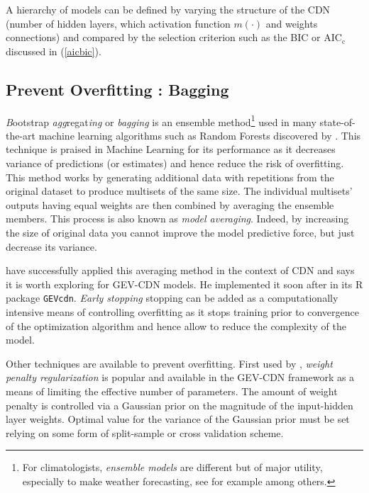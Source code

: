 A hierarchy of models can be defined by varying the structure of the CDN (number of hidden layers, which activation function $m(\cdot)$ and weights connections)  and compared by the selection criterion such as the BIC or $\text{AIC}_{\text{c}}$ discussed in (\ref{aicbic}). 


\subsection{Prevent Overfitting : Bagging} 


\emph{B}ootstrap \emph{agg}regat\emph{ing} or \emph{bagging} is an ensemble method\footnote{For climatologists, \emph{ensemble models} are different but of major utility, especially to make weather forecasting, see for example \citet{suh_development_2012} among others.} used in many state-of-the-art machine learning algorithms such as Random Forests discovered by \citet{Breiman_2001}. This technique is praised in Machine Learning for its performance as it decreases variance of predictions (or estimates) and hence reduce the risk of overfitting. This method works by generating additional data with repetitions from the original dataset to produce multisets of the same size.
The  individual  multisets’  outputs  having equal  weights  are  then  combined  by  averaging the ensemble members. This process is also known as \emph{model averaging}.
Indeed, by increasing the size of original data you cannot improve the model predictive force, but just decrease its variance.

 
\citet{Carney_2005} have successfully applied this averaging method in the context of CDN and \citet{cannon_flexible_2010} says it is worth exploring for GEV-CDN models. He implemented it soon after in its R package \texttt{GEVcdn}. \emph{Early stopping} stopping can be added as a computationally intensive means of controlling overfitting as it stops training prior to convergence of the optimization algorithm and hence allow to reduce the complexity of the model.

Other techniques are available to prevent overfitting. First used by \citet{mackay92b}, \emph{weight penalty regularization} is popular and available in the GEV-CDN framework as a means of limiting the effective number of parameters. The amount of weight penalty is
controlled via a Gaussian prior on the magnitude of the input-hidden layer weights. Optimal value for the
variance of the Gaussian prior must be set relying on some form of split-sample or cross validation scheme.



